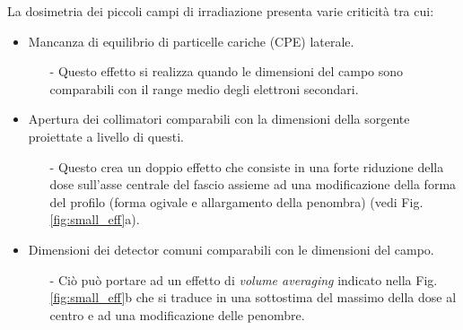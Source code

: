 La dosimetria dei piccoli campi di irradiazione presenta varie criticità \cite{Das2008} tra cui:
\begin{itemize}
\item Mancanza di equilibrio di particelle cariche (CPE) laterale.
\begin{itemize}
\item[-] Questo effetto si realizza quando le dimensioni del campo sono comparabili con il range medio degli elettroni secondari.
\end{itemize}
\item Apertura dei collimatori comparabili con la dimensioni della sorgente proiettate a livello di questi.
\begin{itemize}
\item[-] Questo crea un doppio effetto che consiste in una forte riduzione della dose sull'asse centrale del fascio assieme ad una modificazione della forma del profilo (forma ogivale e allargamento della penombra) (vedi Fig.\ref{fig:small_eff}a).
\end{itemize}
\item Dimensioni dei detector comuni comparabili con le dimensioni del campo.
\begin{itemize}
\item[-] Ciò può portare ad un effetto di \textit{volume averaging} indicato nella Fig.\ref{fig:small_eff}b che si traduce in una sottostima del massimo della dose al centro e ad una modificazione delle penombre.
\end{itemize}
\end{itemize}
